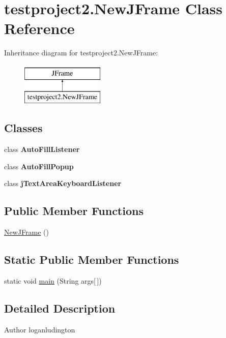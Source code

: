 \hypertarget{classtestproject2_1_1NewJFrame}{\section{testproject2.\-New\-J\-Frame Class Reference}
\label{classtestproject2_1_1NewJFrame}
}
Inheritance diagram for testproject2.\-New\-J\-Frame\-:\begin{figure}[H]
\begin{center}
\leavevmode
\includegraphics[height=2.000000cm]{classtestproject2_1_1NewJFrame}
\end{center}
\end{figure}
\subsection*{Classes}
\begin{DoxyCompactItemize}
\item 
class {\bfseries Auto\-Fill\-Listener}
\item 
class {\bfseries Auto\-Fill\-Popup}
\item 
class {\bfseries j\-Text\-Area\-Keyboard\-Listener}
\end{DoxyCompactItemize}
\subsection*{Public Member Functions}
\begin{DoxyCompactItemize}
\item 
\hyperlink{classtestproject2_1_1NewJFrame_a1099755dc9b88a85dea21532fef90fb9}{New\-J\-Frame} ()
\end{DoxyCompactItemize}
\subsection*{Static Public Member Functions}
\begin{DoxyCompactItemize}
\item 
static void \hyperlink{classtestproject2_1_1NewJFrame_aebffd7abd3d6ed0a4307c36bb2f20fa5}{main} (String args\mbox{[}$\,$\mbox{]})
\end{DoxyCompactItemize}


\subsection{Detailed Description}
\begin{DoxyAuthor}{Author}
loganludington 
\end{DoxyAuthor}


